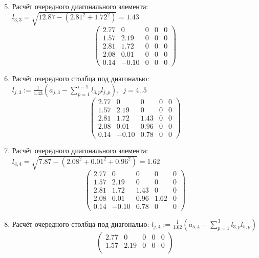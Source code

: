 \begin{multicols}{3}
    \begin{enumerate}
    \setcounter{enumi}{4}
    \item Расчёт очередного диагонального элемента: $l_{3,3} = \sqrt{12.87 - (2.81^2+1.72^2)} = 1.43$
    $$\begin{pmatrix}
        2.77 & 0     & 0    & 0 & 0 \\
        1.57 & 2.19  & 0    & 0 & 0 \\
        2.81 & 1.72  & 0    & 0 & 0 \\
        2.08 & 0.01  & 0    & 0 & 0 \\
        0.14 & -0.10 & 0    & 0 & 0
    \end{pmatrix}$$
    \vspace{-0.5cm}
    \item Расчёт очередного столбца под диагональю: $l_{j,3} := \frac{1}{1.43}(a_{j,3} - \sum_{p=1}^{i-1}l_{3,p}l_{j,p}),~~j=4..5$
    $$\begin{pmatrix}
        2.77 & 0     & 0    & 0 & 0 \\
        1.57 & 2.19  & 0    & 0 & 0 \\
        2.81 & 1.72  & 1.43 & 0 & 0 \\
        2.08 & 0.01  & 0.96 & 0 & 0 \\
        0.14 & -0.10 & 0.78 & 0 & 0
    \end{pmatrix}$$
    \vspace{-0.5cm}
    \item Расчёт очередного диагонального элемента: $l_{4,4} = \sqrt{7.87 - (2.08^2+0.01^2+0.96^2)} = 1.62$
    $$\begin{pmatrix}
        2.77 & 0     & 0    & 0    & 0 \\
        1.57 & 2.19  & 0    & 0    & 0 \\
        2.81 & 1.72  & 1.43 & 0    & 0 \\
        2.08 & 0.01  & 0.96 & 1.62 & 0 \\
        0.14 & -0.10 & 0.78 & 0    & 0
    \end{pmatrix}$$
    \vspace{-0.5cm}
    \item Расчёт очередного столбца под диагональю: $l_{j,4} := \frac{1}{1.62}(a_{5,4} - \sum_{p=1}^{3}l_{3,p}l_{5,p})$
    $$\begin{pmatrix}
        2.77 & 0     & 0    & 0    & 0 \\
        1.57 & 2.19  & 0    & 0    & 0 \\

\end{pmatrix}$$
\end{enumerate}
\end{multicols}
